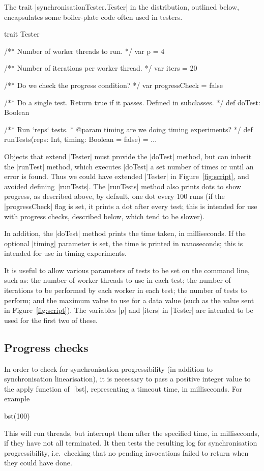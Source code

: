 The trait |synchronisationTester.Tester| in the distribution, outlined below,
encapsulates some boiler-plate code often used in testers.
%
\begin{scala}
trait Tester{
  /** Number of worker threads to run. */
  var p = 4

  /** Number of iterations per worker thread. */
  var iters = 20

  /** Do we check the progress condition? */
  var progressCheck = false

  /** Do a single test.  Return true if it passes.  Defined in subclasses.  */
  def doTest: Boolean

  /** Run `reps` tests.
    * @param timing are we doing timing experiments? */
  def runTests(reps: Int, timing: Boolean = false) = { ... }
}
\end{scala}
%
Objects that extend |Tester| must provide the |doTest| method, but can inherit
the |runTest| method, which executes |doTest| a set number of times or until
an error is found.  Thus we could have extended |Tester| in
Figure~\ref{fig:script}, and avoided defining~|runTests|.  The |runTests|
method also prints dots to show progress, as described above, by default, one
dot every 100 runs (if the |progressCheck| flag is set, it prints a dot after
every test; this is intended for use with progress checks, described below,
which tend to be slower). 

In addition, the |doTest| method prints the time taken, in milliseconds.  If
the optional |timing| parameter is set, the time is printed in nanoseconds;
this is intended for use in timing experiments.

It is useful to allow various parameters of tests to be set on the command
line, such as: the number of worker threads to use in each test; the number of
iterations to be performed by each worker in each test; the number of tests to
perform; and the maximum value to use for a data value (such as the value sent
in Figure~\ref{fig:script}).  The variables |p| and |iters| in |Tester| are
intended to be used for the first two of these.


\subsection{Progress checks}

In order to check for synchronisation progressibility (in addition to
synchronisation linearisation), it is necessary to pass a positive integer
value to the apply function of~|bst|, representing a timeout time, in
milliseconds.  For example
%
\begin{scala}
  bst(100)
\end{scala}
%
This will run threads, but interrupt them after the specified time, in
milliseconds, if they have not all terminated.  It then tests the resulting
log for synchronisation progressibility, i.e.~checking that no pending
invocations failed to return when they could have done.

